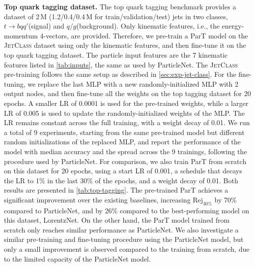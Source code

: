 \documentclass[nohyperref]{article}
\theoremstyle{plain}
\theoremstyle{definition}
\theoremstyle{remark}
\newcommand{\jetclass}{{\textsc{JetClass}}\xspace}
\newcommand{\rej}[1]{\ensuremath{\text{Rej}_{#1}}\xspace}
\newcommand{\tbqq}{\ensuremath{t\to b q q'}\xspace}
\newcommand{\qgj}{\ensuremath{q/g}\xspace}
\begin{document}
\textbf{Top quark tagging dataset.} The top quark tagging benchmark \cite{Kasieczka:2019dbj} provides a dataset of 2\,M (1.2/0.4/0.4\,M for train/validation/test) jets in two classes, \tbqq (signal) and \qgj (background). Only kinematic features, i.e., the energy-momentum 4-vectors, are provided. Therefore, we pre-train a ParT model on the \jetclass dataset using only the kinematic features, and then fine-tune it on the top quark tagging dataset. The particle input features are the 7 kinematic features listed in \cref{tab:inputs}, the same as used by ParticleNet. The \jetclass pre-training follows the same setup as described in \cref{sec:exp-jet-class}. For the fine-tuning, we replace the last MLP with a new randomly-initialized MLP with 2 output nodes, and then fine-tune all the weights on the top tagging dataset for 20 epochs. A smaller LR of 0.0001 is used for the pre-trained weights, while a larger LR of 0.005 is used to update the randomly-initialized weights of the MLP. The LR remains constant across the full training, with a weight decay of 0.01. We run a total of 9 experiments, starting from the same pre-trained model but different random initializations of the replaced MLP, and report the performance of the model with median accuracy and the spread across the 9 trainings, following the procedure used by ParticleNet. For comparison, we also train ParT from scratch on this dataset for 20 epochs, using a start LR of 0.001, a schedule that decays the LR to 1\% in the last 30\% of the epochs, and a weight decay of 0.01. Both results are presented in \cref{tab:top-tagging}. The pre-trained ParT achieves a significant improvement over the existing baselines, increasing \rej{30\%} by 70\% compared to ParticleNet, and by 26\% compared to the best-performing model on this dataset, LorentzNet. On the other hand, the ParT model trained from scratch only reaches similar performance as ParticleNet. We also investigate a similar pre-training and fine-tuning procedure using the ParticleNet model, but only a small improvement is observed compared to the training from scratch, due to the limited capacity of the ParticleNet model.
\end{document}
